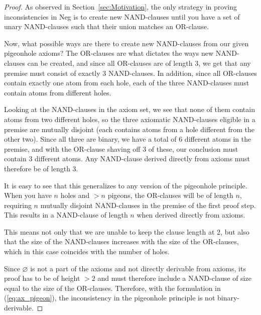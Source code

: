 \begin{proof}
As observed in Section~\ref{sec:Motivation}, the only strategy in proving inconsistencies in Neg is to create new NAND-clauses until you have a set of unary NAND-clauses such that their union matches an OR-clause.

Now, what possible ways are there to create new NAND-clauses from our given pigeonhole axioms?
The OR-clauses are what dictates the ways new NAND-clauses can be created, and since all OR-clauses are of length 3, we get that any premise must consist of exactly 3 NAND-clauses.
In addition, since all OR-clauses contain exactly one atom from each hole, each of the three NAND-clauses must contain atoms from different holes.

Looking at the NAND-clauses in the axiom set, we see that none of them contain atoms from two different holes, so the three axiomatic NAND-clauses eligible in a premise are mutually disjoint (each contains atoms from a hole different from the other two).
Since all three are binary, we have a total of 6 different atoms in the premise, and with the OR-clause shaving off 3 of these, our conclusion must contain 3 different atoms.
Any NAND-clause derived directly from axioms must therefore be of length 3.\par
\begin{figure}[!h]
  \centering
  \begin{prooftree*}
  \end{prooftree*}
  \caption{}
  \label{fig:pigeonhole_not_binary}
\end{figure}
It is easy to see that this generalizes to any version of the pigeonhole principle.
When you have $n$ holes and $>n$ pigeons, the OR-clauses will be of length $n$, requiring $n$ mutually disjoint NAND-clauses in the premise of the first proof step.
This results in a NAND-clause of length $n$ when derived directly from axioms.

This means not only that we are unable to keep the clause length at 2, but also that the size of the NAND-clauses increases with the size of the OR-clauses, which in this case coincides with the number of holes.

Since $\varnothing$ is not a part of the axioms and not directly derivable from axioms, its proof has to be of height $>2$ and must therefore include a NAND-clause of size equal to the size of the OR-clauses.
Therefore, with the formulation in (\ref{eq:ax_pigeon}), the inconsistency in the pigeonhole principle is not binary-derivable.
\end{proof}

